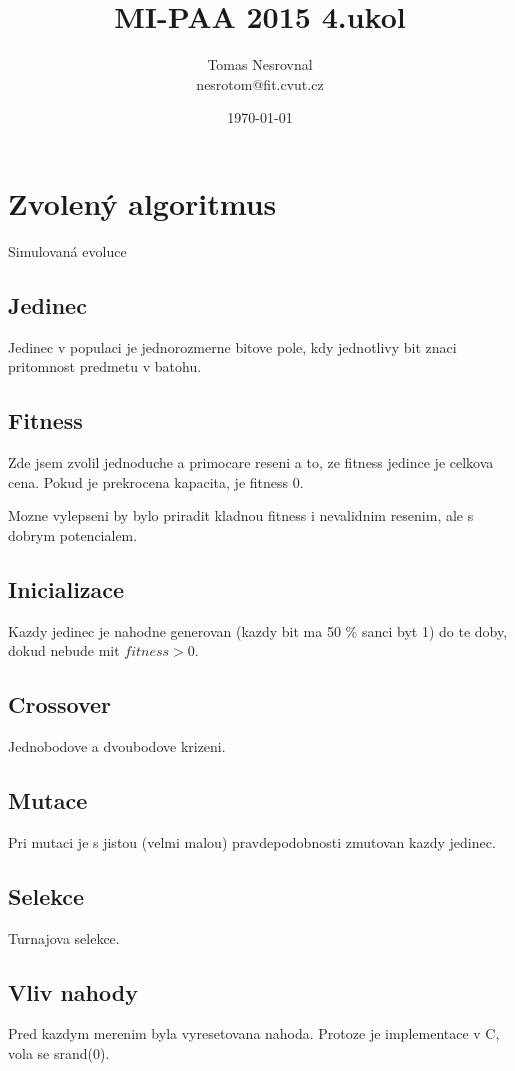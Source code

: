 \documentclass[12pt,a4paper]{article}
\begin{document}
\title{MI-PAA 2015 4.ukol \\
}
\author{Tomas Nesrovnal\\nesrotom@fit.cvut.cz}
\date{\today}
\maketitle

\section{Zvolený algoritmus}
Simulovaná evoluce

\subsection{Jedinec}
Jedinec v populaci je jednorozmerne bitove pole, kdy jednotlivy bit znaci pritomnost predmetu v batohu.

\subsection{Fitness}
Zde jsem zvolil jednoduche a primocare reseni a to, ze fitness jedince je celkova cena. Pokud je prekrocena kapacita, je fitness 0.

Mozne vylepseni by bylo priradit kladnou fitness i nevalidnim resenim, ale s dobrym potencialem.

\subsection{Inicializace}
Kazdy jedinec je nahodne generovan (kazdy bit ma 50 \% sanci byt 1) do te doby, dokud nebude mit $fitness > 0$.

\subsection{Crossover}
Jednobodove a dvoubodove krizeni.

\subsection{Mutace}
Pri mutaci je s jistou (velmi malou) pravdepodobnosti zmutovan kazdy jedinec.

\subsection{Selekce}
Turnajova selekce.

\subsection{Vliv nahody}
Pred kazdym merenim byla vyresetovana nahoda. Protoze je implementace v C, vola se srand(0).
\end{document}
